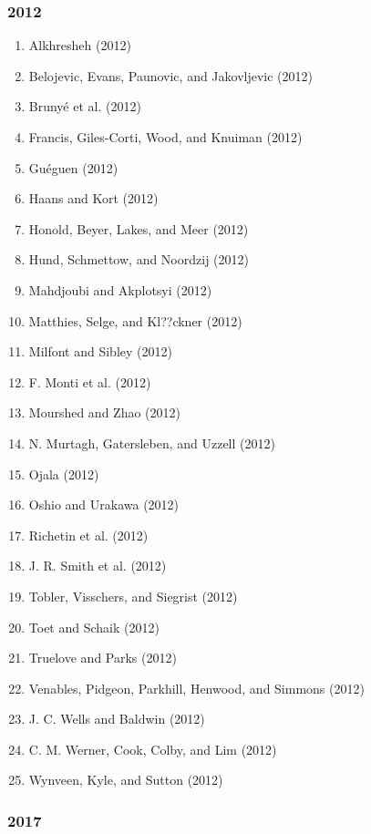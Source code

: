 \documentclass[english,man]{apa6}
\providecommand{\tightlist}{%
  \setlength{\itemsep}{0pt}\setlength{\parskip}{0pt}}
\theoremstyle{definition}
\theoremstyle{definition}
\theoremstyle{definition}
\theoremstyle{remark}
\begin{document}
\subsubsection{2012}\label{section-22}

\begin{enumerate}
\def\labelenumi{\arabic{enumi})}
\tightlist
\item
  Alkhresheh (2012)
\item
  Belojevic, Evans, Paunovic, and Jakovljevic (2012)
\item
  Brunyé et al. (2012)
\item
  Francis, Giles-Corti, Wood, and Knuiman (2012)
\item
  Guéguen (2012)
\item
  Haans and Kort (2012)
\item
  Honold, Beyer, Lakes, and Meer (2012)
\item
  Hund, Schmettow, and Noordzij (2012)
\item
  Mahdjoubi and Akplotsyi (2012)
\item
  Matthies, Selge, and Kl??ckner (2012)
\item
  Milfont and Sibley (2012)
\item
  F. Monti et al. (2012)
\item
  Mourshed and Zhao (2012)
\item
  N. Murtagh, Gatersleben, and Uzzell (2012)
\item
  Ojala (2012)
\item
  Oshio and Urakawa (2012)
\item
  Richetin et al. (2012)
\item
  J. R. Smith et al. (2012)
\item
  Tobler, Visschers, and Siegrist (2012)
\item
  Toet and Schaik (2012)
\item
  Truelove and Parks (2012)
\item
  Venables, Pidgeon, Parkhill, Henwood, and Simmons (2012)
\item
  J. C. Wells and Baldwin (2012)
\item
  C. M. Werner, Cook, Colby, and Lim (2012)
\item
  Wynveen, Kyle, and Sutton (2012)
\end{enumerate}

\subsubsection{2017}\label{section-23}
\end{document}
